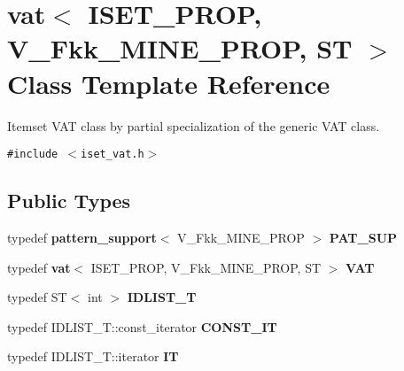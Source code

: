 \section{vat$<$ ISET\_\-PROP, V\_\-Fkk\_\-MINE\_\-PROP, ST $>$ Class Template Reference}
\label{classvat_3_01ISET__PROP_00_01V__Fkk__MINE__PROP_00_01ST_01_4}
Itemset VAT class by partial specialization of the generic VAT class.  


{\tt \#include $<$iset\_\-vat.h$>$}

\subsection*{Public Types}
\begin{CompactItemize}
\item 
typedef {\bf pattern\_\-support}$<$ V\_\-Fkk\_\-MINE\_\-PROP $>$ {\bf PAT\_\-SUP}\label{classvat_3_01ISET__PROP_00_01V__Fkk__MINE__PROP_00_01ST_01_4_w0}

\item 
typedef {\bf vat}$<$ ISET\_\-PROP, V\_\-Fkk\_\-MINE\_\-PROP, ST $>$ {\bf VAT}\label{classvat_3_01ISET__PROP_00_01V__Fkk__MINE__PROP_00_01ST_01_4_w1}

\item 
typedef ST$<$ int $>$ {\bf IDLIST\_\-T}\label{classvat_3_01ISET__PROP_00_01V__Fkk__MINE__PROP_00_01ST_01_4_w2}

\item 
typedef IDLIST\_\-T::const\_\-iterator {\bf CONST\_\-IT}\label{classvat_3_01ISET__PROP_00_01V__Fkk__MINE__PROP_00_01ST_01_4_w3}

\item 
typedef IDLIST\_\-T::iterator {\bf IT}\label{classvat_3_01ISET__PROP_00_01V__Fkk__MINE__PROP_00_01ST_01_4_w4}

\end{CompactItemize}

